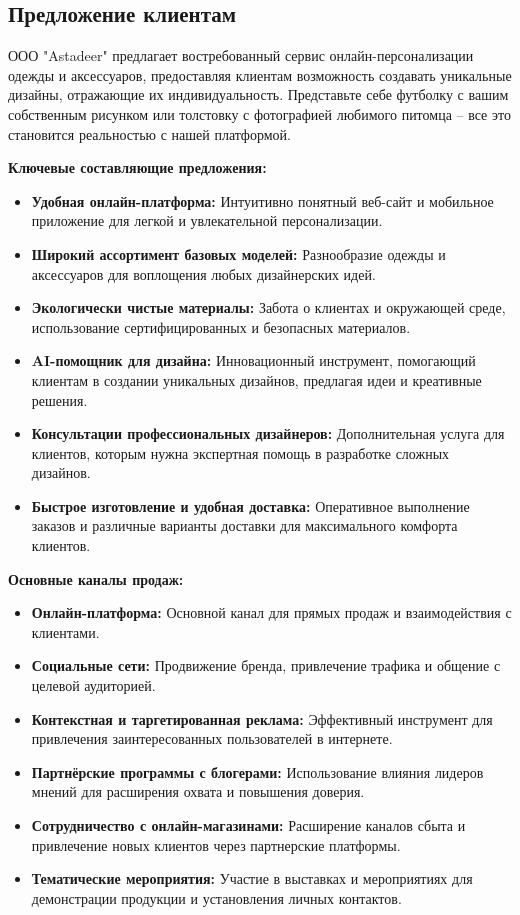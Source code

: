 \subsection{Предложение клиентам}

ООО "Astadeer" предлагает востребованный сервис онлайн-персонализации одежды и аксессуаров, предоставляя клиентам возможность создавать уникальные дизайны, отражающие их индивидуальность.  Представьте себе футболку с вашим собственным рисунком или толстовку с фотографией любимого питомца – все это становится реальностью с нашей платформой.

\textbf{Ключевые составляющие предложения:}
\begin{itemize}
    \item \textbf{Удобная онлайн-платформа:}  Интуитивно понятный веб-сайт и мобильное приложение для легкой и увлекательной персонализации.
    \item \textbf{Широкий ассортимент базовых моделей:}  Разнообразие одежды и аксессуаров для воплощения любых дизайнерских идей.
    \item \textbf{Экологически чистые материалы:}  Забота о клиентах и окружающей среде, использование сертифицированных и безопасных материалов.
    \item \textbf{AI-помощник для дизайна:}  Инновационный инструмент, помогающий клиентам в создании уникальных дизайнов, предлагая идеи и креативные решения.
    \item \textbf{Консультации профессиональных дизайнеров:}  Дополнительная услуга для клиентов, которым нужна экспертная помощь в разработке сложных дизайнов.
    \item \textbf{Быстрое изготовление и удобная доставка:}  Оперативное выполнение заказов и различные варианты доставки для максимального комфорта клиентов.
\end{itemize}

\textbf{Основные каналы продаж:}
\begin{itemize}
    \item \textbf{Онлайн-платформа:}  Основной канал для прямых продаж и взаимодействия с клиентами.
    \item \textbf{Социальные сети:}  Продвижение бренда, привлечение трафика и общение с целевой аудиторией.
    \item \textbf{Контекстная и таргетированная реклама:}  Эффективный инструмент для привлечения заинтересованных пользователей в интернете.
    \item \textbf{Партнёрские программы с блогерами:}  Использование влияния лидеров мнений для расширения охвата и повышения доверия.
    \item \textbf{Сотрудничество с онлайн-магазинами:}  Расширение каналов сбыта и привлечение новых клиентов через партнерские платформы.
    \item \textbf{Тематические мероприятия:}  Участие в выставках и мероприятиях для демонстрации продукции и установления личных контактов.
\end{itemize}

